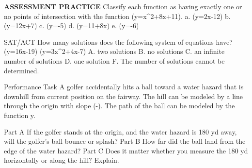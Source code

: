 \documentclass{article}
\newenvironment{practice}[2]{}{}        %
\newcommand{\answer}[1]{}               %
\newcommand{\placeholder}[2]{}          %
\newcommand{\te}[1]{}                   %
\begin{document}
\begin{practice}{27}{1}
\textbf{ASSESSMENT PRACTICE}
Classify each function as having exactly one or no points of intersection with the function (y=x^2+8x+11).
a. (y=2x-12)
b. (y=12x+7)
c. (y=-5)
d. (y=11+8x)
e. (y=-6)
\answer{a. no; b. exactly one; c. exactly one; d. exactly one; e. no}
\end{practice}
\begin{practice}{28}{1}
SAT/ACT How many solutions does the following system of equations have?
(y=16x-19)
(y=3x^2+4x-7)
A. two solutions
B. no solutions
C. an infinite number of solutions
D. one solution
F. The number of solutions cannot be determined.
\answer{D}
\te{Printed final choice is labeled F.}
\end{practice}
\begin{practice}{29}{3}
Performance Task A golfer accidentally hits a ball toward a water hazard that is downhill from current position on the fairway. The hill can be modeled by a line through the origin with slope (-). The path of the ball can be modeled by the function y.
\placeholder{illustration}{Golfer at right on green fairway, water hazard at left down the hill; black parabolic trajectory bends upward then down toward water with left arrow. Callout (y=-\frac{1}{100}x^2+\frac{3}{2}x). No axes or tick labels.}
Part A If the golfer stands at the origin, and the water hazard is 180 yd away, will the golfer's ball bounce or splash?
Part B How far did the ball land from the edge of the water hazard?
Part C Does it matter whether you measure the 180 yd horizontally or along the hill? Explain.
\answer{Part A bounce. Part B 17.5 yards. Part C Yes; if you measure 180 yards along the hill, that is a smaller distance horizontally than 180.}
\end{practice}
\end{document}
